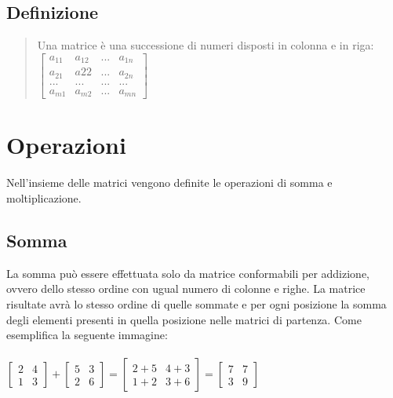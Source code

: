 \documentclass[a4paper]{article}
\begin{document}
\subsection{Definizione}

\vspace*{\fill} 
\begin{quote} 
\centering 
Una matrice è una successione di numeri disposti in colonna e in riga:
\bigskip \\
	$\left[\begin{matrix}a_{11} & a_{12} & ... & a_{1n} \\ a_{21} & a{22} & ... & a_{2n} \\ ... & ... & ... & ...\\ a_{m1} & a_{m2} & ... & a_{mn}\end{matrix}\right]$
\end{quote}
\vspace*{\fill}

\section{Operazioni}
Nell'insieme delle matrici vengono definite le operazioni di somma e moltiplicazione.

\subsection{Somma}
La somma può essere effettuata solo da matrice conformabili per addizione, ovvero dello stesso ordine con ugual numero di colonne e righe. La matrice risultate avrà lo stesso ordine di quelle sommate e per ogni posizione la somma degli elementi presenti in quella posizione nelle matrici di partenza. Come esemplifica la seguente immagine:
\\
\\
$\left[\begin{matrix}2 & 4 \\ 1 & 3\end{matrix}\right] + \left[\begin{matrix}5 & 3 \\ 2 & 6\end{matrix}\right] = \left[\begin{matrix} 2+5 & 4+3 \\ 1+2 & 3+6\end{matrix}\right] = \left[\begin{matrix}7 & 7 \\ 3 & 9\end{matrix}\right]
$
\\
\end{document}
